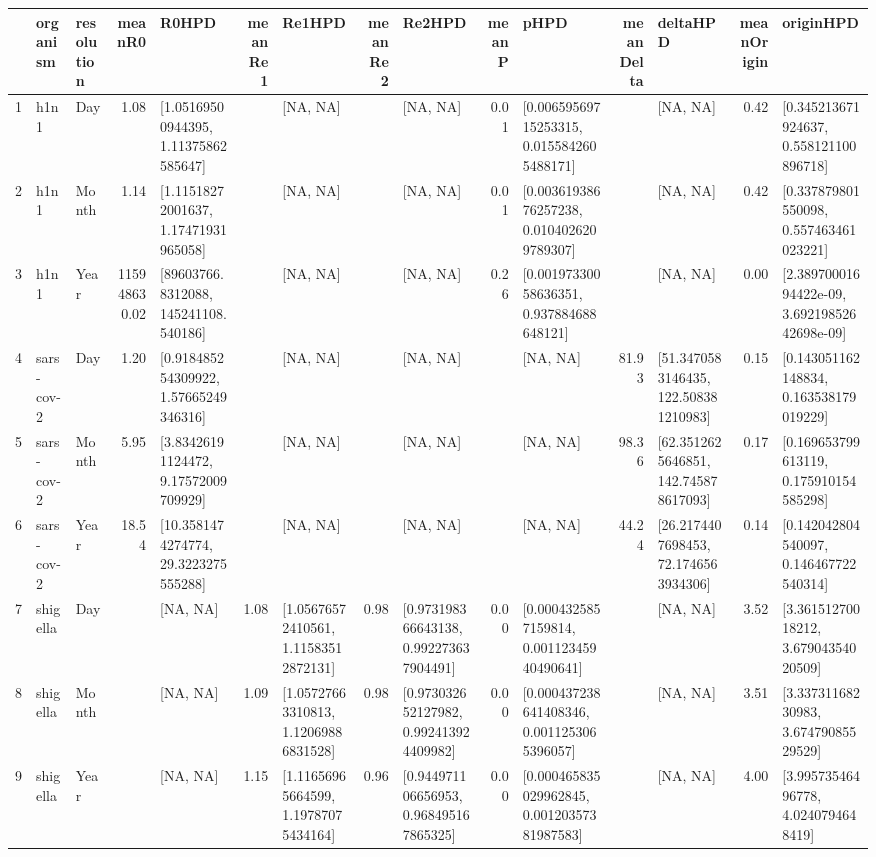 \documentclass{article}
\begin{document}
\begin{spacing}{1.5}
\begin{table}[ht]
\centering
\begin{tabular}{rllrlrlrlrlrlrl}
  \hline
 & organism & resolution & meanR0 & R0HPD & meanRe1 & Re1HPD & meanRe2 & Re2HPD & meanP & pHPD & meanDelta & deltaHPD & meanOrigin & originHPD \\ 
  \hline
1 & h1n1 & Day & 1.08 & [1.05169500944395, 1.11375862585647] &  & [NA, NA] &  & [NA, NA] & 0.01 & [0.00659569715253315, 0.0155842605488171] &  & [NA, NA] & 0.42 & [0.345213671924637, 0.558121100896718] \\ 
  2 & h1n1 & Month & 1.14 & [1.11518272001637, 1.17471931965058] &  & [NA, NA] &  & [NA, NA] & 0.01 & [0.00361938676257238, 0.0104026209789307] &  & [NA, NA] & 0.42 & [0.337879801550098, 0.557463461023221] \\ 
  3 & h1n1 & Year & 115948630.02 & [89603766.8312088, 145241108.540186] &  & [NA, NA] &  & [NA, NA] & 0.26 & [0.00197330058636351, 0.937884688648121] &  & [NA, NA] & 0.00 & [2.38970001694422e-09, 3.69219852642698e-09] \\ 
  4 & sars-cov-2 & Day & 1.20 & [0.918485254309922, 1.57665249346316] &  & [NA, NA] &  & [NA, NA] &  & [NA, NA] & 81.93 & [51.3470583146435, 122.508381210983] & 0.15 & [0.143051162148834, 0.163538179019229] \\ 
  5 & sars-cov-2 & Month & 5.95 & [3.83426191124472, 9.17572009709929] &  & [NA, NA] &  & [NA, NA] &  & [NA, NA] & 98.36 & [62.3512625646851, 142.745878617093] & 0.17 & [0.169653799613119, 0.175910154585298] \\ 
  6 & sars-cov-2 & Year & 18.54 & [10.3581474274774, 29.3223275555288] &  & [NA, NA] &  & [NA, NA] &  & [NA, NA] & 44.24 & [26.2174407698453, 72.1746563934306] & 0.14 & [0.142042804540097, 0.146467722540314] \\ 
  7 & shigella & Day &  & [NA, NA] & 1.08 & [1.05676572410561, 1.11583512872131] & 0.98 & [0.973198366643138, 0.992273637904491] & 0.00 & [0.0004325857159814, 0.00112345940490641] &  & [NA, NA] & 3.52 & [3.36151270018212, 3.67904354020509] \\ 
  8 & shigella & Month &  & [NA, NA] & 1.09 & [1.05727663310813, 1.12069886831528] & 0.98 & [0.973032652127982, 0.992413924409982] & 0.00 & [0.000437238641408346, 0.0011253065396057] &  & [NA, NA] & 3.51 & [3.33731168230983, 3.67479085529529] \\ 
  9 & shigella & Year &  & [NA, NA] & 1.15 & [1.11656965664599, 1.19787075434164] & 0.96 & [0.944971106656953, 0.968495167865325] & 0.00 & [0.000465835029962845, 0.00120357381987583] &  & [NA, NA] & 4.00 & [3.99573546496778, 4.0240794648419] \\ 

\end{tabular}
\end{table}
\end{spacing}
\end{document}
